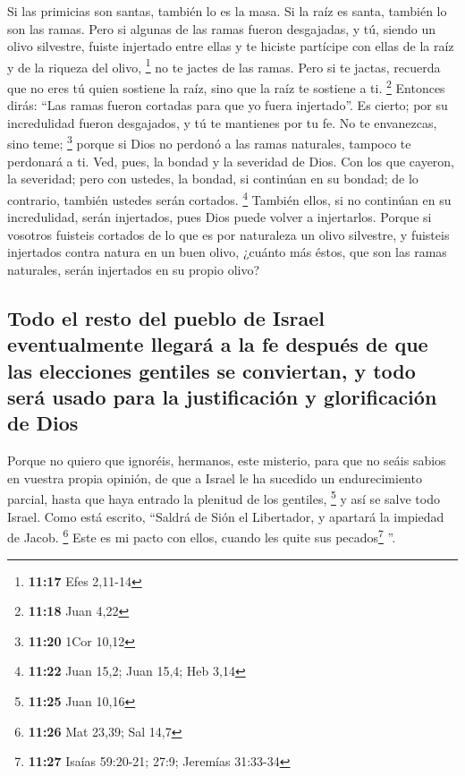  Si las primicias son santas, también lo es la masa. Si
la raíz es santa, también lo son las ramas.  Pero si
algunas de las ramas fueron desgajadas, y tú, siendo un olivo silvestre,
fuiste injertado entre ellas y te hiciste partícipe con ellas de la raíz
y de la riqueza del olivo, \footnote{\textbf{11:17} Efes 2,11-14}
 no te jactes de las ramas. Pero si te jactas, recuerda
que no eres tú quien sostiene la raíz, sino que la raíz te sostiene a
ti. \footnote{\textbf{11:18} Juan 4,22}  Entonces dirás:
``Las ramas fueron cortadas para que yo fuera injertado''.
 Es cierto; por su incredulidad fueron desgajados, y tú
te mantienes por tu fe. No te envanezcas, sino teme; \footnote{\textbf{11:20}
  1Cor 10,12}  porque si Dios no perdonó a las ramas
naturales, tampoco te perdonará a ti.  Ved, pues, la
bondad y la severidad de Dios. Con los que cayeron, la severidad; pero
con ustedes, la bondad, si continúan en su bondad; de lo contrario,
también ustedes serán cortados. \footnote{\textbf{11:22} Juan 15,2; Juan
  15,4; Heb 3,14}  También ellos, si no continúan en su
incredulidad, serán injertados, pues Dios puede volver a injertarlos.
 Porque si vosotros fuisteis cortados de lo que es por
naturaleza un olivo silvestre, y fuisteis injertados contra natura en un
buen olivo, ¿cuánto más éstos, que son las ramas naturales, serán
injertados en su propio olivo?

\hypertarget{todo-el-resto-del-pueblo-de-israel-eventualmente-llegaruxe1-a-la-fe-despuuxe9s-de-que-las-elecciones-gentiles-se-conviertan-y-todo-seruxe1-usado-para-la-justificaciuxf3n-y-glorificaciuxf3n-de-dios}{%
\subsection{Todo el resto del pueblo de Israel eventualmente llegará a
la fe después de que las elecciones gentiles se conviertan, y todo será
usado para la justificación y glorificación de
Dios}\label{todo-el-resto-del-pueblo-de-israel-eventualmente-llegaruxe1-a-la-fe-despuuxe9s-de-que-las-elecciones-gentiles-se-conviertan-y-todo-seruxe1-usado-para-la-justificaciuxf3n-y-glorificaciuxf3n-de-dios}}

 Porque no quiero que ignoréis, hermanos, este misterio,
para que no seáis sabios en vuestra propia opinión, de que a Israel le
ha sucedido un endurecimiento parcial, hasta que haya entrado la
plenitud de los gentiles, \footnote{\textbf{11:25} Juan 10,16}
 y así se salve todo Israel. Como está escrito, ``Saldrá
de Sión el Libertador, y apartará la impiedad de Jacob. \footnote{\textbf{11:26}
  Mat 23,39; Sal 14,7}  Este es mi pacto con ellos,
cuando les quite sus pecados\footnote{\textbf{11:27} Isaías 59:20-21;
  27:9; Jeremías 31:33-34} ''.

